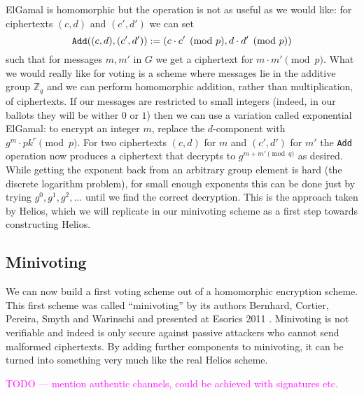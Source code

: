\documentclass{llncs}
\newcommand{\alg}[1]{\textup{\texttt{#1}}}
\begin{document}
ElGamal is homomorphic but the operation is not as useful as we would like:
for ciphertexts $(c, d)$ and $(c', d')$ we can set
\[
\alg{Add}((c, d), (c', d')) := (c \cdot c' \pmod{p}, d \cdot d' \pmod{p})
\]
such that for messages $m, m'$ in $G$ we get a ciphertext for $m \cdot m'
\pmod{p}$. What we would really like for voting is a scheme where messages lie
in the additive group $\mathbb Z_q$ and we can perform homomorphic addition,
rather than multiplication, of ciphertexts. If our messages are restricted to
small integers (indeed, in our ballots they will be wither $0$ or $1$) then we
can use a variation called exponential ElGamal: to encrypt an integer $m$,
replace the $d$-component with $g^m \cdot pk^r \pmod{p}$. For two ciphertexts
$(c, d)$ for $m$ and $(c', d')$ for $m'$ the \alg{Add} operation now produces a
ciphertext that decrypts to $g^{m + m' \pmod{q}}$ as desired. While getting the
exponent back from an arbitrary group element is hard (the discrete logarithm
problem), for small enough exponents this can be done just by trying $g^0, g^1,
g^2, \ldots$ until we find the correct decryption. This is the approach taken by
Helios, which we will replicate in our minivoting scheme as a first step towards
constructing Helios.

\subsection{Minivoting}

We can now build a first voting scheme out of a homomorphic encryption scheme.
This first scheme was called ``minivoting'' by its authors Bernhard, Cortier,
Pereira, Smyth and Warinschi and presented at Esorics 2011 \cite{BCPSW11}.
Minivoting is not verifiable and indeed is only secure against passive attackers
who cannot send malformed ciphertexts. By adding further components to
minivoting, it can be turned into something very much like the real Helios
scheme.

\textcolor{Fuchsia}{TODO --- mention authentic channels, could be achieved with signatures etc.}
\end{document}
